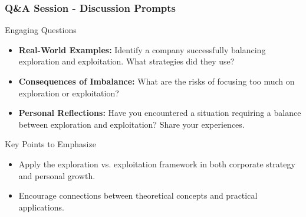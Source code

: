 \documentclass[aspectratio=169]{beamer}
\begin{document}
\begin{frame}[fragile]
    \frametitle{Q\&A Session - Discussion Prompts}
    \begin{block}{Engaging Questions}
        \begin{itemize}
            \item \textbf{Real-World Examples:} Identify a company successfully balancing exploration and exploitation. What strategies did they use?
            \item \textbf{Consequences of Imbalance:} What are the risks of focusing too much on exploration or exploitation?
            \item \textbf{Personal Reflections:} Have you encountered a situation requiring a balance between exploration and exploitation? Share your experiences.
        \end{itemize}
    \end{block}
    
    \begin{block}{Key Points to Emphasize}
        \begin{itemize}
            \item Apply the exploration vs. exploitation framework in both corporate strategy and personal growth.
            \item Encourage connections between theoretical concepts and practical applications.
        \end{itemize}
    \end{block}
\end{frame}
\end{document}
